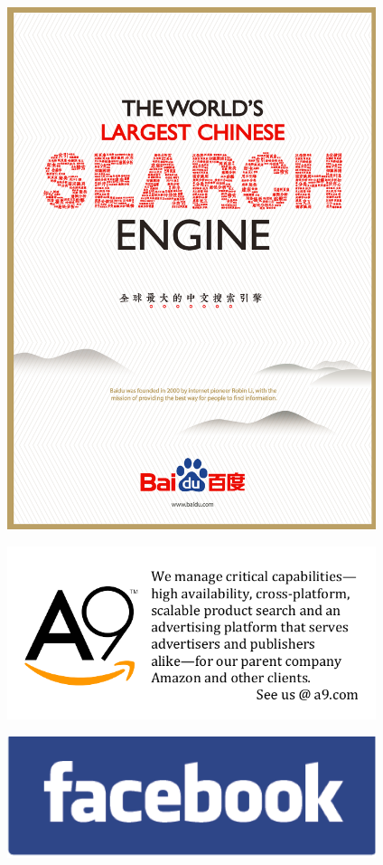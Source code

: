 \clearpage
\thispagestyle{empty}

\vfill
\includegraphics[width=4.25in]{content/ads/platinum/baidu2.png}
\vfill

\newpage
\thispagestyle{empty}

\includegraphics[width=4.25in]{content/ads/silver/A9-Ad.pdf}

\vfill

\includegraphics[width=4.25in]{content/ads/bronze/facebook.png}

